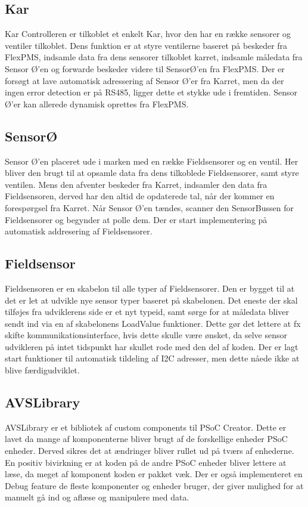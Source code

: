\subsection{Kar}
Kar Controlleren er tilkoblet et enkelt Kar, hvor den har en række sensorer og ventiler tilkoblet. Dens funktion er at styre ventilerne baseret på beskeder fra FlexPMS, indsamle data fra dens sensorer tilkoblet karret, indsamle måledata fra Sensor Ø'en og forwarde beskeder videre til SensorØ'en fra FlexPMS. Der er forsøgt at lave automatisk adressering af Sensor Ø'er fra Karret, men da der ingen error detection er på RS485, ligger dette et stykke ude i fremtiden. Sensor Ø'er kan allerede dynamisk oprettes fra FlexPMS.

\subsection{SensorØ}
Sensor Ø'en placeret ude i marken med en række Fieldsensorer og en ventil. Her bliver den brugt til at opsamle data fra dens tilkoblede Fieldsensorer, samt styre ventilen. Mens den afventer beskeder fra Karret, indsamler den data fra Fieldsensoren, derved har den altid de opdaterede tal, når der kommer en forespørgsel fra Karret. Når Sensor Ø'en tændes, scanner den SensorBussen for Fieldsensorer og begynder at polle dem. Der er start implementering på automatisk addresering af Fieldsensorer. 

\subsection{Fieldsensor}
Fieldsensoren er en skabelon til alle typer af Fieldsensorer. Den er bygget til at det er let at udvikle nye sensor typer baseret på skabelonen. Det eneste der skal tilføjes fra udviklerens side er et nyt typeid, samt sørge for at måledata bliver sendt ind via en af skabelonens LoadValue funktioner. Dette gør det lettere at fx skifte kommunikationsinterface, hvis dette skulle være ønsket, da selve sensor udvikleren på intet tidspunkt har skullet rode med den del af koden. Der er lagt start funktioner til automatisk tildeling af I2C adresser, men dette nåede ikke at blive færdigudviklet.

\subsection{AVSLibrary}
AVSLibrary er et bibliotek af custom components til PSoC Creator. Dette er lavet da mange af komponenterne bliver brugt af de forskellige enheder PSoC enheder. Derved sikres det at ændringer bliver rullet ud på tværs af enhederne. En positiv bivirkning er at koden på de andre PSoC enheder bliver lettere at læse, da meget af komponent koden er pakket væk. Der er også implementeret en Debug feature de fleste komponenter og enheder bruger, der giver mulighed for at manuelt gå ind og aflæse og manipulere med data.


